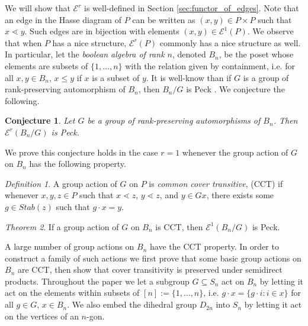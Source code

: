 \documentclass[10 pt]{amsart}
\theoremstyle{plain}
\newtheorem{conjecture}[theorem]{Conjecture}
\theoremstyle{definition}
\theoremstyle{remark}
\numberwithin{equation}{section}
\newtheorem{thm}{Theorem}[section]
\theoremstyle{remark}
\newtheorem{defn}[thm]{Definition}
\begin{document}
We will show that $\mathcal E^r$ is well-defined in Section \ref{sec:functor_of_edges}. Note that an edge in the Hasse diagram of $P$ can be written as $(x,y)\in P\times P$ such that $x\lessdot y$. Such edges are in bijection with elements $(x, y)\in \mathcal E^1(P).$  
We observe that when $P$ has a nice structure, $\mathcal E^r(P)$ commonly has a nice structure as well.  
In particular, let the \textit{boolean algebra of rank $n$}, denoted $B_n$, be the poset whose elements are subsets of $\{1,\ldots,n\}$ with the relation given by containment, i.e. for all $x,y\in B_n$, $x\le y$ if $x$ is a subset of $y$.  
It is well-know than if $G$ is a group of rank-preserving  automorphism of $B_n$, then $B_n/G$ is Peck .  We conjecture the following.

\begin{conjecture}\label{conj:F_of_BnG_Peck}
Let $G$ be a group of rank-preserving automorphisms of $B_n$.  Then $\mathcal E^r(B_n/G)$ is Peck.
\end{conjecture}

We prove this conjecture holds in the case $r=1$ whenever the group action of $G$ on $B_n$ has the following property.

\begin{defn}
\label{defn:cover_transitive}
A group action of $G$ on $P$ is \textit{common cover transitive}, (CCT) if whenever $x,y,z\in P$ such that $x\lessdot z$, $y\lessdot z$, and $y\in Gx$, there exists some $g\in Stab(z)$ such that $g\cdot x = y.$
\end{defn}

\begin{thm}\label{thm:cover_transitive_implies_Peck}
If a group action of $G$ on $B_n$ is CCT, then $\mathcal E^1(B_n/G)$ is Peck.
\end{thm}


A large number of group actions on $B_n$ have the CCT property.  In order to construct a family of such actions we first prove that some basic group actions on $B_n$ are CCT, then show that cover transitivity is preserved under semidirect products.  Throughout the paper we let a subgroup $G\subseteq S_n$ act on $B_n$ by letting it act on the elements within subsets of $[n]:= \{1,\ldots, n\}$, i.e. $g\cdot x = \{g\cdot i\colon i\in x\}$   for all $g\in G$, $x\in B_n$.  We also embed the dihedral group $D_{2n}$ into $S_n$ by letting it act on the vertices of an $n$-gon.
\end{document}
